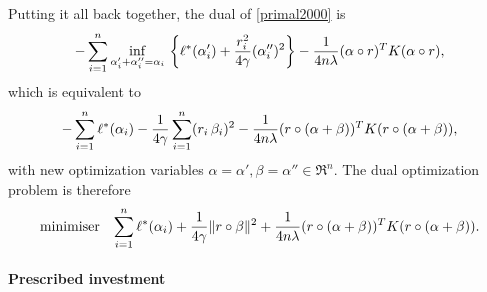 Putting it all back together, the dual of \eqref{primal2000} is
\begin{equation}
  -\sum_{i=1}^n \inf_{\alpha_i'+\alpha_i''=\alpha_i}\,\left\{\ell^*(\alpha_i') + \frac{r_i^2}{4\gamma}(\alpha_i'')^2\right\}  - \frac{1}{4n\lambda} (\alpha \circ r)^TK(\alpha \circ r),
\end{equation}
which is equivalent to
\begin{equation}
  -\sum_{i=1}^n \ell^*(\alpha_i) - \frac{1}{4\gamma}\sum_{i=1}^n (r_i\,\beta_i)^2 - \frac{1}{4n\lambda}(r \circ (\alpha+\beta))^TK(r \circ (\alpha+\beta)),
\end{equation}
with new optimization variables $\alpha=\alpha',\beta=\alpha'' \in \Re^n$. The dual optimization problem is
therefore
\begin{equation}
  \begin{array}{ll} \displaystyle{\operatorname*{minimiser}_{}} & \displaystyle{\sum_{i=1}^n\ell^*(\alpha_i) + \frac{1}{4\gamma}\|r\circ\beta\|^2 + \frac{1}{4n\lambda}(r \circ (\alpha+\beta))^TK(r \circ (\alpha+\beta)).} \end{array}
\end{equation}


\paragraph{Prescribed investment}
\todo{}



